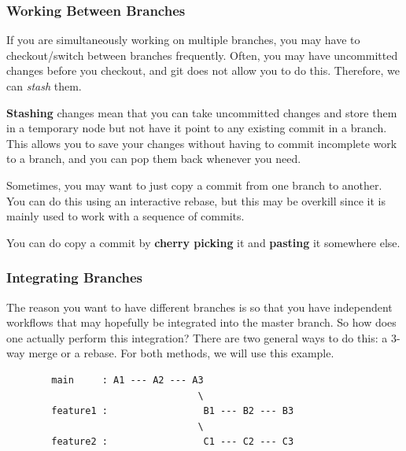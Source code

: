\documentclass{article}
\begin{document}
    \subsubsection{Working Between Branches} 

      If you are simultaneously working on multiple branches, you may have to checkout/switch between branches frequently. Often, you may have uncommitted changes before you checkout, and git does not allow you to do this. Therefore, we can \textit{stash} them. 

      \begin{definition}[Stash]
        \textbf{Stashing} changes mean that you can take uncommitted changes and store them in a temporary node but not have it point to any existing commit in a branch. This allows you to save your changes without having to commit incomplete work to a branch, and you can pop them back whenever you need. 
      \end{definition} 

      Sometimes, you may want to just copy a commit from one branch to another. You can do this using an interactive rebase, but this may be overkill since it is mainly used to work with a sequence of commits. 

      \begin{definition}
        You can do copy a commit by \textbf{cherry picking} it and \textbf{pasting} it somewhere else. 
      \end{definition} 

    \subsubsection{Integrating Branches} 

      The reason you want to have different branches is so that you have independent workflows that may hopefully be integrated into the master branch. So how does one actually perform this integration? There are two general ways to do this: a 3-way merge or a rebase. For both methods, we will use this example. 
      \begin{lstlisting}
        main     : A1 --- A2 --- A3
                                  \
        feature1 :                 B1 --- B2 --- B3
                                  \
        feature2 :                 C1 --- C2 --- C3
      \end{lstlisting}
\end{document}
